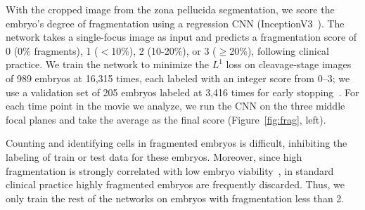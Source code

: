 
 With the cropped image from the zona pellucida segmentation, we score the embryo's degree of fragmentation using a regression CNN (InceptionV3~\cite{szegedy2016rethinking}). The network takes a single-focus image as input and predicts a fragmentation score of 0 (0\% fragments), 1 ($<$10\%), 2 (10-20\%), or 3 ($\ge$20\%), following clinical practice. We train the network to minimize the $L^1$ loss on cleavage-stage images of 989 embryos at 16,315 times, each labeled with an integer score from 0--3; we use a validation set of 205 embryos labeled at 3,416 times for early stopping~\cite{goodfellow2016deep}. For each time point in the movie we analyze, we run the CNN on the three middle focal planes and take the average as the final score (Figure~\ref{fig:frag}, left).

Counting and identifying cells in fragmented embryos is difficult, inhibiting the labeling of train or test data for these embryos. Moreover, since high fragmentation is strongly correlated with low embryo viability~\cite{alikani1999human}, in standard clinical practice highly fragmented embryos are frequently discarded. Thus, we only train the rest of the networks on embryos with fragmentation less than 2.

